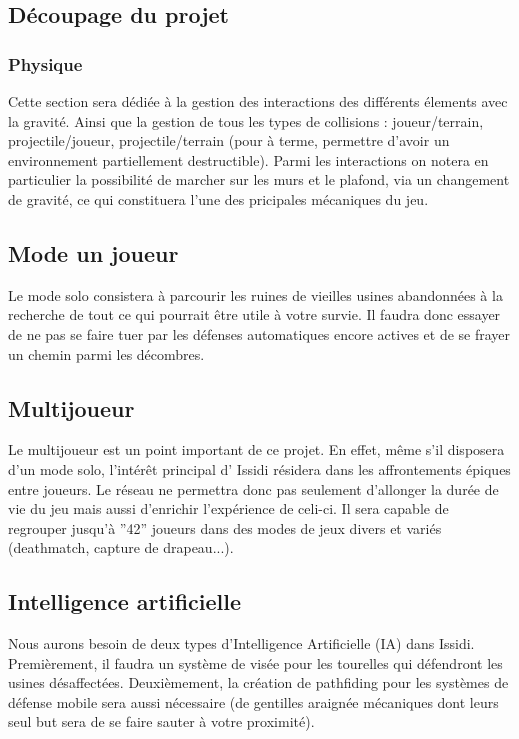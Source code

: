 ﻿\documentclass[12pt]{article}
\begin{document}
\subsection{Découpage du projet}
\subsubsection{Physique}
Cette section sera dédiée à la gestion des interactions des différents élements avec
la gravité. Ainsi que la gestion de tous les types de collisions : joueur/terrain,
projectile/joueur, projectile/terrain (pour à terme, permettre d’avoir un environnement
partiellement destructible).
Parmi les interactions on notera en particulier la possibilité de marcher sur les murs 
et le plafond, via un changement de gravité, ce qui constituera l’une des pricipales
mécaniques du jeu.

\subsection{Mode un joueur}
Le mode solo consistera à parcourir les ruines de vieilles usines abandonnées à la recherche
de tout ce qui pourrait être utile à votre survie. Il faudra donc essayer de ne pas se faire
tuer par les défenses automatiques encore actives et de se frayer un chemin parmi les décombres.

\subsection{Multijoueur}
Le multijoueur est un point important de ce projet.
En effet, même s’il disposera d’un mode solo, l’intérêt principal d’ Issidi résidera dans les
affrontements épiques entre joueurs. Le réseau ne permettra donc pas seulement d’allonger
la durée de vie du jeu mais aussi d’enrichir l’expérience de celi-ci. Il sera capable
de regrouper jusqu’à ”42” joueurs dans des modes de jeux divers et variés (deathmatch, capture de drapeau...).

\subsection{Intelligence artificielle}
Nous aurons besoin de deux types d’Intelligence Artiﬁcielle (IA) dans Issidi.
Premièrement, il faudra un système de visée pour les tourelles qui défendront
les usines désaffectées. Deuxièmement, la création de pathﬁding pour les systèmes
de défense mobile sera aussi nécessaire (de gentilles araignée mécaniques dont leurs
seul but sera de se faire sauter à votre proximité).
\end{document}
